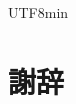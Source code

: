 \documentclass[conference, dvipdfmx]{IEEEtran}
\begin{document}
\begin{CJK}{UTF8}{min}
\section*{謝辞}



\vspace{12pt}


\end{CJK}
\end{document}

